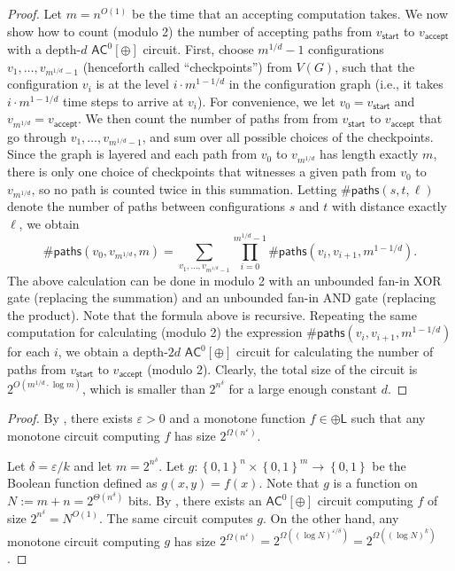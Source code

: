 \documentclass[10pt,a4paper]{article}
\newcommand{\eps}{\varepsilon}
\newcommand{\complexityfont}[1]{\mathsf{#1}}
\def\AC           {\complexityfont{AC}}
\def\pL           {\oplus\complexityfont{L}}
\newcommand{\set}[1]{\left\{#1\right\}}
\newcommand{\blt}{\set{0,1}}
\begin{document}
\begin{proof}
    Let $m = n^{O(1)}$ be the time that an accepting computation takes.
    We now show
    how to count (modulo 2)
    the number of accepting paths from
    $v_{\mathsf{start}}$
    to
    $v_{\mathsf{accept}}$ with a depth-$d$ $\AC^0[\oplus]$ circuit.
    First, choose
    $m^{1/d}-1$ configurations $v_1,\dots,v_{m^{1/d}-1}$
    (henceforth called ``checkpoints'')
    from $V(G)$, such that the configuration
    $v_i$ is at the level
    $i \cdot m^{1-1/d}$ in the configuration graph
    (i.e., it takes $i \cdot m^{1-1/d}$ time steps to arrive at $v_i$).
    For convenience, we let $v_0 = v_{\mathsf{start}}$
    and $v_{m^{1/d}} = v_{\mathsf{accept}}$.
    We then count the number of paths from 
    from $v_{\mathsf{start}}$
    to $v_{\mathsf{accept}}$
    that go through $v_1,\dots,v_{m^{1/d}-1}$,
    and sum over all possible choices of the checkpoints.
    Since the graph is layered and
    each path from $v_0$ to $v_{m^{1/d}}$ has length exactly $m$,
    there is only one choice of checkpoints that witnesses
    a given path from $v_0$ to $v_{m^{1/d}}$,
    so no path is counted twice in this summation.
    Letting
    $\#\mathsf{paths}(s,t,\ell)$ denote the number of paths between
    configurations $s$ and $t$ with distance exactly $\ell$,
    we obtain
    \begin{equation*}
        \#\mathsf{paths}(v_{0},v_{m^{1/d}}, m)
        =
        \sum_{v_1,\dots,v_{m^{1/d}-1}}
        \prod_{i=0}^{m^{1/d}-1}
        \#\mathsf{paths}(v_i,v_{i+1}, m^{1-1/d}).
    \end{equation*}
    The above calculation can be done in modulo 2 with an unbounded fan-in XOR gate
    (replacing the summation)
    and an unbounded fan-in AND gate
    (replacing the product).
    Note that the formula above is recursive.
    Repeating the same computation for calculating (modulo 2)
    the expression
    $\#\mathsf{paths}(v_i,v_{i+1}, m^{1-1/d})$ for each $i$,
    we obtain a depth-$2d$ $\AC^0[\oplus]$ circuit
    for calculating the number of paths from $v_{\mathsf{start}}$ to
    $v_{\mathsf{accept}}$ (modulo 2).
    Clearly, the total size of the circuit is
    $2^{O(m^{1/d} \cdot \log m)}$,
    which is smaller than $2^{n^\delta}$ for a large enough constant $d$.
\end{proof}

\begin{proof}
    By , there exists $\eps > 0$ and 
    a monotone function $f \in \pL$
    such that any monotone circuit computing $f$ has size
    $2^{\Omega(n^\eps)}$.

    Let $\delta = \eps/k$ and let $m = 2^{n^{\delta}}$.
    Let $g : \blt^{n} \times \blt^{m} \to \blt$
    be the Boolean function defined as
    $g(x,y) = f(x)$.
    Note that $g$ is a function on $N := m + n = 2^{\Theta(n^{\delta})}$
    bits.
    By ,
    there exists an $\AC^0[\oplus]$ circuit computing
    $f$ of size $2^{n^{\delta}} = N^{O(1)}$. The same circuit computes $g$.
    On the other hand, any monotone circuit computing $g$
    has size
    $2^{\Omega(n^\eps)} = 2^{\Omega((\log N)^{\eps / \delta})} =
    2^{\Omega((\log N)^k)}$.
\end{proof}
\end{document}
